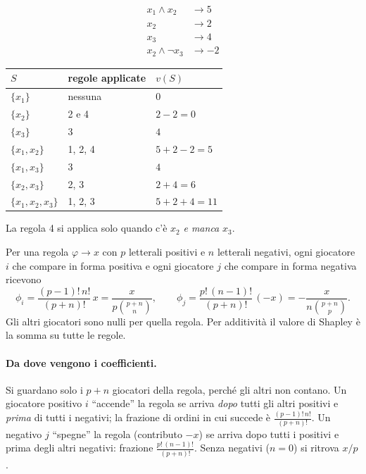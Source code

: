 \begin{esempio}
\par\smallskip\noindent
\begin{minipage}[t]{0.4\linewidth}
\vspace{0pt}
\[
\begin{aligned}
  x_1 \land x_2 &\to 5\\
  x_2 &\to 2\\
  x_3 &\to 4\\
  x_2 \land \lnot x_3 &\to -2
\end{aligned}
\]
\end{minipage}%
\begin{minipage}[t]{0.6\linewidth}
\vspace{0pt}
\renewcommand{\arraystretch}{1.15}
\begin{tabular}{lll}
\toprule
$S$ & regole applicate & $v(S)$ \\
\midrule
$\{x_1\}$ & nessuna & $0$ \\
$\{x_2\}$ & 2 e 4 & $2 - 2 = 0$ \\
$\{x_3\}$ & 3 & $4$ \\
$\{x_1,x_2\}$ & 1, 2, 4 & $5 + 2 - 2 = 5$ \\
$\{x_1,x_3\}$ & 3 & $4$ \\
$\{x_2,x_3\}$ & 2, 3 & $2 + 4 = 6$ \\
$\{x_1,x_2,x_3\}$ & 1, 2, 3 & $5 + 2 + 4 = 11$ \\
\bottomrule
\end{tabular}
\end{minipage}
\par\smallskip
La regola 4 si applica solo quando c'è $x_2$ \emph{e manca} $x_3$.
\end{esempio}

\begin{teorema}
Per una regola $\varphi \to x$ con $p$ letterali positivi e $n$ letterali negativi, ogni
giocatore $i$ che compare in forma positiva e ogni giocatore $j$ che compare in forma
negativa ricevono
\[
  \phi_i = \frac{(p-1)!\,n!}{(p+n)!}\,x = \frac{x}{p\binom{p+n}{n}}, \qquad
  \phi_j = \frac{p!\,(n-1)!}{(p+n)!}\,(-x) = -\frac{x}{n\binom{p+n}{p}}.
\]
Gli altri giocatori sono nulli per quella regola. Per additività il valore di Shapley è la
somma su tutte le regole.
\end{teorema}

\paragraph{Da dove vengono i coefficienti.}
Si guardano solo i $p + n$ giocatori della regola, perché gli altri non contano. Un
giocatore positivo $i$ ``accende'' la regola se arriva \emph{dopo} tutti gli altri positivi
e \emph{prima} di tutti i negativi; la frazione di ordini in cui succede è
$\frac{(p-1)!\,n!}{(p+n)!}$. Un negativo $j$ ``spegne'' la regola (contributo $-x$) se
arriva dopo tutti i positivi e prima degli altri negativi: frazione
$\frac{p!\,(n-1)!}{(p+n)!}$. Senza negativi ($n = 0$) si ritrova $x/p$.

